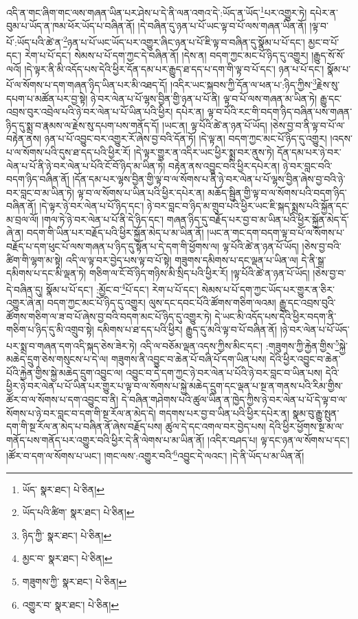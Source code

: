 འདི་ན་གང་ཞིག་གང་ལས་གཞན་ཡིན་པར་ཤེས་པ་དེ་ནི་ལན་འགའ་དེ་:ཡོད་ན་ཡོད་\footnote{ཡོད་  སྣར་ཐང་།  པེ་ཅིན། }པར་འགྱུར་ཏེ། དཔེར་ན་བུམ་པ་ཡོད་ན་ཁམ་ཕོར་ཡོད་པ་བཞིན་ནོ། །དེ་བཞིན་དུ་ཉན་པ་པོ་ཡང་ལྟ་བ་པོ་ལས་གཞན་ཡིན་ནོ། །ལྟ་བ་པོ་:ཡོད་པའི་ཚེ་ན་\footnote{ཡོད་པའི་ཚིག་  སྣར་ཐང་།  པེ་ཅིན། }ཉན་པ་པོ་ཡང་ཡོད་པར་འགྱུར་ཞིང་ཉན་པ་པོ་ཇི་ལྟ་བ་བཞིན་དུ་སྣོམ་པ་པོ་དང་། མྱང་བ་པོ་དང་། རེག་པ་པོ་དང་། སེམས་པ་པོ་དག་ཀྱང་དེ་བཞིན་ནོ། །དེས་ན། བདག་ཀྱང་མང་པོ་ཉིད་དུ་འགྱུར། །རྒྱུད་སོ་སོ་ལའོ། །དེ་ལྟར་ནི་མི་འདོད་པས་དེའི་ཕྱིར་དོན་དམ་པར་རྒྱུད་ཐ་དད་པ་དག་གི་ལྟ་བ་པོ་དང་། ཉན་པ་པོ་དང་། སྣོམ་པ་པོ་ལ་སོགས་པ་དག་གཞན་ཉིད་ཡིན་པར་མི་འཐད་དོ། །འདིར་ཡང་སྐབས་ཀྱི་དོན་ལ་ཕན་པ་:ཉིད་ཀྱིས་\footnote{ཉིད་ཀྱི་  སྣར་ཐང་།  པེ་ཅིན། }རྗེས་སུ་དཔག་པ་མཚོན་པར་བྱ་སྟེ། ཉེ་བར་ལེན་པ་པོ་ལྷས་བྱིན་གྱི་ཉན་པ་པོ་ནི། ལྟ་བ་པོ་ལས་གཞན་མ་ཡིན་ཏེ། རྒྱུ་དང་འབྲས་བུར་འབྲེལ་པའི་ཉེ་བར་ལེན་པ་པོ་ཡིན་པའི་ཕྱིར། དཔེར་ན། ལྟ་བ་པོའི་རང་གི་བདག་ཉིད་བཞིན་པས་གཞན་ཉིད་དུ་སྨྲ་བ་རྣམས་ལ་རྗེས་སུ་དཔག་པས་གནོད་དོ། །ཡང་ན། ལྟ་པོའི་ཚེ་ན་ཉན་པོ་ཡོད། །ཅེས་བྱ་བ་ནི་ལྟ་བ་པོ་ལ་བརྟེན་ནས། ཉན་པ་པོ་འབྱུང་བར་འགྱུར་རོ་ཞེས་བྱ་བའི་དོན་ཏོ། །དེ་ལྟ་ན། བདག་ཀྱང་མང་པོ་ཉིད་དུ་འགྱུར། །འདས་པ་ལ་སོགས་པའི་དུས་ཐ་དད་པའི་ཕྱིར་རོ། །དེ་ལྟར་གྱུར་ན་འདིར་ཡང་ཕྱིར་སྨྲ་བར་ནུས་ཏེ། དོན་དམ་པར་ཉེ་བར་ལེན་པ་པོ་ནི་ཉེ་བར་ལེན་པ་པོའི་ངོ་བོ་ཉིད་མ་ཡིན་ཏེ། བརྟེན་ནས་འབྱུང་བའི་ཕྱིར་དཔེར་ན། ཉེ་བར་བླང་བའི་བདག་ཉིད་བཞིན་ནོ། །དོན་དམ་པར་ལྷས་བྱིན་གྱི་ལྟ་བ་ལ་སོགས་པ་ནི་ཉེ་བར་ལེན་པ་པོ་ལྷས་བྱིན་ཞེས་བྱ་བའི་ཉེ་བར་བླང་བ་མ་ཡིན་ཏེ། ལྟ་བ་ལ་སོགས་པ་ཡིན་པའི་ཕྱིར་དཔེར་ན། མཆོད་སྦྱིན་གྱི་ལྟ་བ་ལ་སོགས་པའི་བདག་ཉིད་བཞིན་ནོ། །དེ་ལྟར་ཉེ་བར་ལེན་པ་པོ་ཉིད་དང་། ཉེ་བར་བླང་བ་ཉིད་མ་གྲུབ་པའི་ཕྱིར་ཡང་ཇི་སྐད་སྨྲས་པའི་སྐྱོན་དང་མ་བྲལ་ལོ། །གལ་ཏེ་ཉེ་བར་ལེན་པ་པོ་ནི་དེ་ཉིད་དང་། གཞན་ཉིད་དུ་བརྗོད་པར་བྱ་བ་མ་ཡིན་པའི་ཕྱིར་སྐྱོན་མེད་དོ་ཞེ་ན། བདག་གི་ཡིན་པར་བརྗོད་པའི་ཕྱིར་སྐྱོན་མེད་པ་མ་ཡིན་ནོ། །ཡང་ན་གང་དག་བདག་ལྟ་བ་པོ་ལ་སོགས་པ་བརྗོད་པ་དག་ཕུང་པོ་ལས་གཞན་པ་ཉིད་དུ་སྟོན་པ་དེ་དག་གི་ཕྱོགས་ལ། ལྟ་པོའི་ཚེ་ན་ཉན་པོ་ཡོད། །ཅེས་བྱ་བའི་ཚིག་གི་ལྷག་མ་སྟེ། འདི་ལ་ལྟ་བར་བྱེད་པས་ལྟ་བ་པོ་སྟེ། གཟུགས་དམིགས་པ་དང་ལྡན་པ་ཡིན་ལ། དེ་ནི་སྒྲ་དམིགས་པ་དང་མི་ལྡན་ཏེ། གཅིག་ལ་ངོ་བོ་ཉིད་གཉིས་མི་སྲིད་པའི་ཕྱིར་རོ། །ལྟ་པོའི་ཚེ་ན་ཉན་པོ་ཡོད། །ཅེས་བྱ་བ་དེ་བཞིན་དུ། སྣོམ་པ་པོ་དང་། :མྱོང་བ་\footnote{མྱང་བ་  སྣར་ཐང་།  པེ་ཅིན། }པོ་དང་། རེག་པ་པོ་དང་། སེམས་པ་པོ་དག་ཀྱང་ཡོད་པར་གྱུར་ན་ཅིར་འགྱུར་ཞེ་ན། བདག་ཀྱང་མང་པོ་ཉིད་དུ་འགྱུར། ལུས་དང་དབང་པོའི་ཚོགས་གཅིག་ལའམ། རྒྱུ་དང་འབྲས་བུའི་ཚོགས་གཅིག་ལ་ཟ་བ་པོ་ཞེས་བྱ་བའི་བདག་མང་པོ་ཉིད་དུ་འགྱུར་ཏེ། དེ་ཡང་མི་འདོད་པས་དེའི་ཕྱིར་བདག་ནི་གཅིག་པ་ཉིད་དུ་མི་འགྲུབ་སྟེ། དམིགས་པ་ཐ་དད་པའི་ཕྱིར། རྒྱུད་དུ་མའི་ལྟ་བ་པོ་བཞིན་ནོ། །ཉེ་བར་ལེན་པ་པོ་ཡོད་པར་སྨྲ་བ་གཞན་དག་འདི་སྐད་ཅེས་ཟེར་ཏེ། འདི་ལ་བཅོམ་ལྡན་འདས་ཀྱིས་མིང་དང་། :གཟུགས་ཀྱི་རྐྱེན་གྱིས་\footnote{གཟུགས་ཀྱི་  སྣར་ཐང་།  པེ་ཅིན། }སྐྱེ་མཆེད་དྲུག་ཅེས་གསུངས་པ་དེ་ལ། གཟུགས་ནི་འབྱུང་བ་ཆེན་པོ་བཞི་པོ་དག་ཡིན་པས། དེའི་ཕྱིར་འབྱུང་བ་ཆེན་པོའི་རྐྱེན་གྱིས་སྐྱེ་མཆེད་དྲུག་འབྱུང་ལ། འབྱུང་བ་དེ་དག་ཀྱང་ཉེ་བར་ལེན་པ་པོའི་ཉེ་བར་བླང་བ་ཡིན་པས། དེའི་ཕྱིར་ཉེ་བར་ལེན་པ་པོ་ཡིན་པར་གྱུར་པ་ལྟ་བ་ལ་སོགས་པ་སྐྱེ་མཆེད་དྲུག་དང་ལྡན་པ་སྔ་ན་གནས་པའི་རིམ་གྱིས་ཚོར་བ་ལ་སོགས་པ་དག་འབྱུང་བ་ནི། དེ་བཞིན་གཤེགས་པའི་ཚུལ་ཡིན་ན་ཁྱེད་ཀྱིས་ཉེ་བར་ལེན་པ་པོ་དེ་ལྟ་བ་ལ་སོགས་པ་ཉེ་བར་བླང་བ་དག་གི་སྔ་རོལ་ན་མེད་དེ། གདགས་པར་བྱ་བ་ཡིན་པའི་ཕྱིར་དཔེར་ན། སྣམ་བུ་རྒྱུ་སྤུན་དག་གི་སྔ་རོལ་ན་མེད་པ་བཞིན་ནོ་ཞེས་བརྗོད་པས། ཚུལ་དེ་དང་འགལ་བར་བྱེད་པས། དེའི་ཕྱིར་ཕྱོགས་སྔ་མ་ལ་གནོད་པས་གནོད་པར་འགྱུར་བའི་ཕྱིར་དེ་ནི་ལེགས་པ་མ་ཡིན་ནོ། །འདིར་བཤད་པ། ལྟ་དང་ཉན་ལ་སོགས་པ་དང་། །ཚོར་བ་དག་ལ་སོགས་པ་ཡང་། །གང་ལས་:འགྱུར་བའི་\footnote{འགྱུར་བ་  སྣར་ཐང་།  པེ་ཅིན། }འབྱུང་དེ་ལའང་། །དེ་ནི་ཡོད་པ་མ་ཡིན་ནོ། 